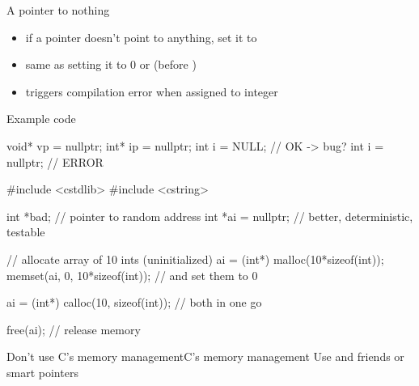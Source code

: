 \begin{frame}[fragile]
  \begin{block}{A pointer to nothing}
    \begin{itemize}
    \item if a pointer doesn't point to anything, set it to 
    \item same as setting it to 0 or  (before )
    \item triggers compilation error when assigned to integer
    \end{itemize}
  \end{block}
  \pause
  \begin{exampleblock}{Example code}
    \begin{cppcode*}{}
      void* vp = nullptr;
      int* ip = nullptr;
      int i = NULL;      // OK -> bug?
      int i = nullptr;   // ERROR
    \end{cppcode*}
  \end{exampleblock}
\end{frame}

\begin{frame}[fragile]
  \begin{cppcode}
    #include <cstdlib>
    #include <cstring>

    int *bad;          // pointer to random address
    int *ai = nullptr; // better, deterministic, testable

    // allocate array of 10 ints (uninitialized)
    ai = (int*) malloc(10*sizeof(int));
    memset(ai, 0, 10*sizeof(int)); // and set them to 0

    ai = (int*) calloc(10, sizeof(int)); // both in one go

    free(ai); // release memory
  \end{cppcode}
  \begin{goodpracticeWithShortcut}{Don't use C's memory management}{C's memory management}
    Use  and friends or smart pointers
  \end{goodpracticeWithShortcut}
\end{frame}

